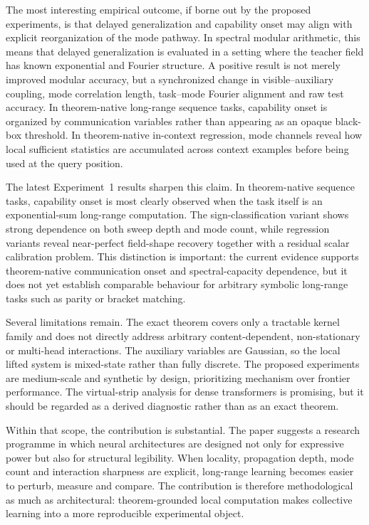\documentclass[11pt]{article}
\theoremstyle{definition}
\begin{document}
The most interesting empirical outcome, if borne out by the proposed experiments, is that delayed generalization and capability onset may align with explicit reorganization of the mode pathway. In spectral modular arithmetic, this means that delayed generalization is evaluated in a setting where the teacher field has known exponential and Fourier structure. A positive result is not merely improved modular accuracy, but a synchronized change in visible--auxiliary coupling, mode correlation length, task--mode Fourier alignment and raw test accuracy. In theorem-native long-range sequence tasks, capability onset is organized by communication variables rather than appearing as an opaque black-box threshold. In theorem-native in-context regression, mode channels reveal how local sufficient statistics are accumulated across context examples before being used at the query position.


The latest Experiment~1 results sharpen this claim. In theorem-native sequence tasks, capability onset is most clearly observed when the task itself is an exponential-sum long-range computation. The sign-classification variant shows strong dependence on both sweep depth and mode count, while regression variants reveal near-perfect field-shape recovery together with a residual scalar calibration problem. This distinction is important: the current evidence supports theorem-native communication onset and spectral-capacity dependence, but it does not yet establish comparable behaviour for arbitrary symbolic long-range tasks such as parity or bracket matching.

Several limitations remain. The exact theorem covers only a tractable kernel family and does not directly address arbitrary content-dependent, non-stationary or multi-head interactions. The auxiliary variables are Gaussian, so the local lifted system is mixed-state rather than fully discrete. The proposed experiments are medium-scale and synthetic by design, prioritizing mechanism over frontier performance. The virtual-strip analysis for dense transformers is promising, but it should be regarded as a derived diagnostic rather than as an exact theorem.

Within that scope, the contribution is substantial. The paper suggests a research programme in which neural architectures are designed not only for expressive power but also for structural legibility. When locality, propagation depth, mode count and interaction sharpness are explicit, long-range learning becomes easier to perturb, measure and compare. The contribution is therefore methodological as much as architectural: theorem-grounded local computation makes collective learning into a more reproducible experimental object.
\end{document}
